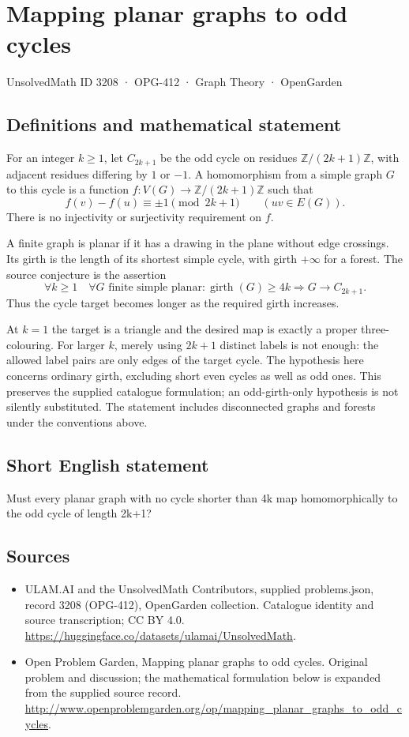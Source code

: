 \documentclass[11pt,a4paper]{article}
\begin{document}
\section*{Mapping planar graphs to odd cycles}\label{3208}
{\small UnsolvedMath ID 3208 · OPG-412 · Graph Theory · OpenGarden}
\subsection{Definitions and mathematical statement}
For an integer $k\geq1$, let $C_{2k+1}$
be the odd cycle on residues
$\mathbb Z/(2k+1)\mathbb Z$, with adjacent
residues differing by $1$ or $-1$.
A homomorphism from a simple graph $G$
to this cycle is a function
$f:V(G)\to\mathbb Z/(2k+1)\mathbb Z$
such that
\[
 f(v)-f(u)\equiv\pm1\pmod{2k+1}
 \qquad(uv\in E(G)).
\]
There is no injectivity or surjectivity
requirement on $f$.

A finite graph is planar if it has a
drawing in the plane without edge
crossings. Its girth is the length of
its shortest simple cycle, with girth
$+\infty$ for a forest. The source
conjecture is the assertion
\[
 \forall k\geq1\quad\forall G\text{ finite simple planar}:
 \operatorname{girth}(G)\geq4k
 \Longrightarrow G\to C_{2k+1}.
\]
Thus the cycle target becomes longer
as the required girth increases.

At $k=1$ the target is a triangle and
the desired map is exactly a proper
three-colouring. For larger $k$, merely
using $2k+1$ distinct labels is not
enough: the allowed label pairs are
only edges of the target cycle.
The hypothesis here concerns ordinary
girth, excluding short even cycles
as well as odd ones. This preserves
the supplied catalogue formulation;
an odd-girth-only hypothesis is not
silently substituted. The statement
includes disconnected graphs and
forests under the conventions above.
\subsection{Short English statement}
Must every planar graph with no cycle shorter than 4k map homomorphically to the odd cycle of length 2k+1?
\subsection{Sources}
\begin{itemize}
\item[S1] ULAM.AI and the UnsolvedMath Contributors, supplied problems.json, record 3208 (OPG-412), OpenGarden collection. Catalogue identity and source transcription; CC BY 4.0.
\url{https://huggingface.co/datasets/ulamai/UnsolvedMath}.
\item[S2] Open Problem Garden, Mapping planar graphs to odd cycles. Original problem and discussion; the mathematical formulation below is expanded from the supplied source record.
\url{http://www.openproblemgarden.org/op/mapping_planar_graphs_to_odd_cycles}.
\end{itemize}
\end{document}

